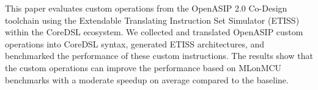 This paper evaluates custom operations from the OpenASIP 2.0 Co-Design toolchain using the Extendable Translating Instruction Set Simulator (ETISS) within the CoreDSL ecosystem. We collected and translated OpenASIP custom operations into CoreDSL syntax, generated ETISS architectures, and benchmarked the performance of these custom instructions. The results show that the custom operations can improve the performance based on MLonMCU benchmarks with a moderate speedup on average compared to the baseline.